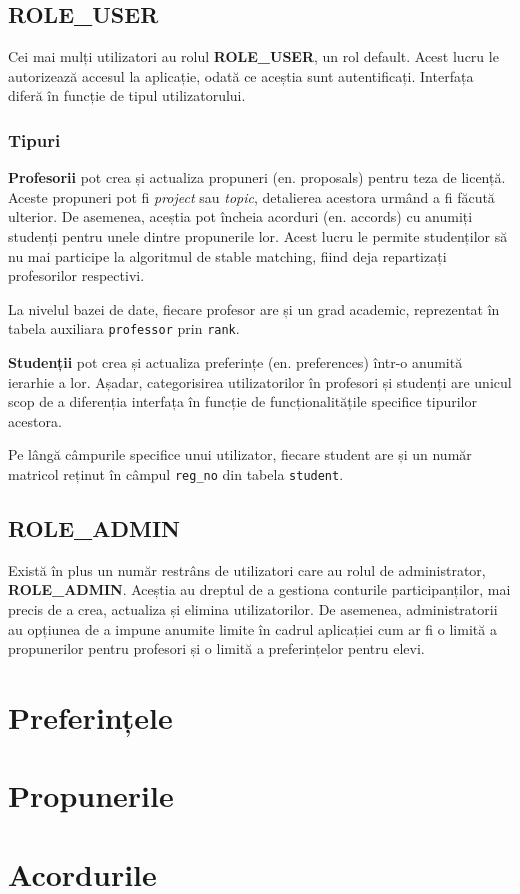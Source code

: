 \subsection{ROLE\_USER}

Cei mai mulți utilizatori au rolul \textbf{ROLE\_USER}, un rol default. Acest lucru le autorizează accesul la aplicație, odată ce aceștia sunt autentificați. Interfața diferă în funcție de tipul utilizatorului.

\subsubsection{Tipuri}

\textbf{Profesorii} pot crea și actualiza propuneri (en. proposals) pentru teza de licență. Aceste propuneri pot fi \textit{project} sau \textit{topic}, detalierea acestora urmând a fi făcută ulterior. De asemenea, aceștia pot încheia acorduri (en. accords) cu anumiți studenți pentru unele dintre propunerile lor. Acest lucru le permite studenților să nu mai participe la algoritmul de stable matching, fiind deja repartizați profesorilor respectivi.

La nivelul bazei de date, fiecare profesor are și un grad academic, reprezentat în tabela auxiliara \texttt{professor} prin \texttt{rank}.

\textbf{Studenții} pot crea și actualiza preferințe (en. preferences) într-o anumită ierarhie a lor. Așadar, categorisirea utilizatorilor în profesori și studenți are unicul scop de a diferenția interfața în funcție de funcționalitățile specifice tipurilor acestora.

Pe lângă câmpurile specifice unui utilizator, fiecare student are și un număr matricol reținut în câmpul \texttt{reg\_no} din tabela \texttt{student}.

\subsection{ROLE\_ADMIN}

Există în plus un număr restrâns de utilizatori care au rolul de administrator, \textbf{ROLE\_ADMIN}. Aceștia au dreptul de a gestiona conturile participanților, mai precis de a crea, actualiza și elimina utilizatorilor. De asemenea, administratorii au opțiunea de a impune anumite limite în cadrul aplicației cum ar fi o limită a propunerilor pentru profesori și o limită a preferințelor pentru elevi.

\section{Preferințele}

\section{Propunerile}

\section{Acordurile}